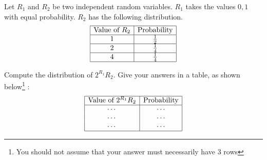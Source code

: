 \documentclass[11pt, twoside]{article}
\begin{document}
\begin{problems}


\problem  {} %
\bparts
\ppart%
Let $R_1$ and $R_2$ be two independent random variables.
$R_1$ takes the values $0,1$ with equal probability.
$R_2$ has the following distribution.
\[
\begin{array}{|c|c|}
\hline
 \text{Value of }R_2 & \text{Probability} \\
\hline
           1           &    \frac{1}{2}     \\
\hline
           2           &    \frac{1}{4}     \\
\hline
           4           &    \frac{1}{4}     \\
\hline
\end{array}
\]


Compute the distribution of $2 ^{R_1} R_2$. Give your answers in a table, as shown below\footnote{You should not assume that your answer must necessarily have 3 rows} :
\[
\begin{array}{|c|c|}
\hline
 \text{Value of }2 ^{R_1} R_2  & \text{Probability} \\
\hline
 \cdots &   \cdots    \\
 \cdots &   \cdots    \\
 \cdots &   \cdots    \\\hline
\end{array}
\]

\end{problems}
\end{document}
